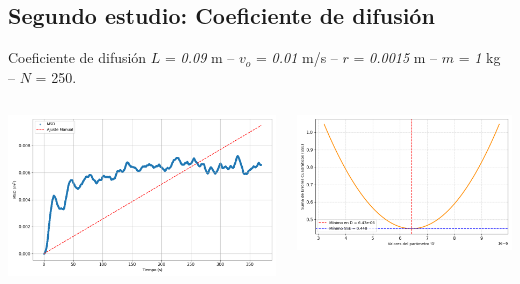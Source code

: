 \documentclass{beamer}
\begin{document}
\subsection{Segundo estudio: Coeficiente de difusión}
\begin{frame}{Coeficiente de difusión}
  \tiny {} $L$ = \textit{0.09} m -- $v_o$ = \textit{0.01} m/s -- $r$ = \textit{0.0015} m -- $m$ = \textit{1} kg -- $N$ = 250.
  \begin{columns}
    \begin{column}{0.50\textwidth}
      \includegraphics[width=1.10\linewidth]{photoMaterial/MSD_09.png}
    \end{column}
    \begin{column}{0.50\textwidth}
      \includegraphics[width=1.10\linewidth]{photoMaterial/CMSD09.png}
    \end{column}
  \end{columns}
\end{frame}

\end{document}

